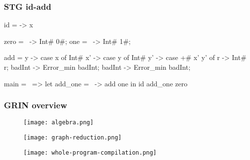 \documentclass[bigger]{beamer}
\begin{document}
\begin{frame}[fragile]
\frametitle{STG id-add}
\begin{center}

	\begin{haskellcode}
		id = \x -> x
	\end{haskellcode}
	\begin{haskellcode}
		zero = \ -> Int# 0#;
		one  = \ -> Int# 1#;
	\end{haskellcode}
	\begin{haskellcode}
		add = \x y -> case x of
		  Int# x' -> case y of
		    Int# y' -> case +# x' y' of
		      r -> Int# r;
		    badInt -> Error_min badInt;
		  badInt -> Error_min badInt;
	\end{haskellcode}
	\begin{haskellcode}
		main = \ => let add_one = \ -> add one
		            in id add_one zero
	\end{haskellcode}

\end{center}
\end{frame}




\begin{frame}[fragile]
\frametitle{GRIN overview}
\begin{center}

	\begin{minipage}{0.30\textwidth}
		\begin{figure}
			\texttt{[image: algebra.png]}
		\end{figure}
	\end{minipage}
	\hfill
	\pause
	\begin{minipage}{0.30\textwidth}
		\begin{figure}
			\texttt{[image: graph-reduction.png]}
		\end{figure}
	\end{minipage}
	\hfill
	\pause
	\begin{minipage}{0.30\textwidth}
		\begin{figure}
			\texttt{[image: whole-program-compilation.png]}
		\end{figure}
	\end{minipage}

\end{center}
\end{frame}
\end{document}
